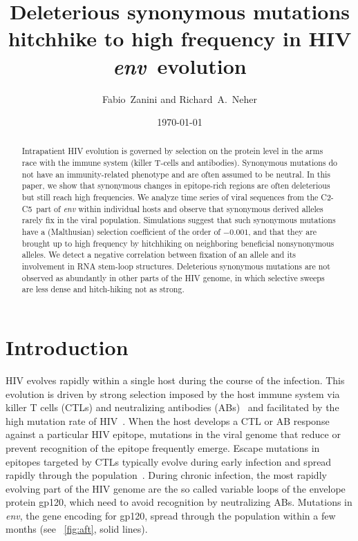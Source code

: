 \documentclass[rmp, twocolumn]{revtex4}
\newcommand{\env}{\textit{env}}
\newcommand{\shankaregion}{C2-C5}
\newcommand{\Author}{Fabio~Zanini and Richard~A.~Neher}
\newcommand{\Title}{Deleterious synonymous mutations hitchhike to high frequency in HIV \env~evolution}
\begin{document}
\title{\Title}
\author{\Author}
\date{\today}

\begin{abstract}
\noindent
Intrapatient HIV evolution is governed by selection on the protein level in the
arms race with the immune system (killer T-cells and antibodies). Synonymous
mutations do not have an immunity-related phenotype and are often assumed to be
neutral. In this paper, we show that synonymous changes in epitope-rich regions
are often deleterious but still reach high frequencies.  We analyze time
series of viral sequences from the \shankaregion~part of {\it env} within individual
hosts and observe that synonymous derived alleles rarely fix in the
viral population. Simulations suggest that such synonymous mutations
have a (Malthusian) selection coefficient of the order of $-0.001$, and that
they are brought up to high frequency by hitchhiking on neighboring beneficial
nonsynonymous alleles. We detect a negative correlation between fixation of an allele and
its involvement in RNA stem-loop structures.
Deleterious synonymous mutations are not observed as abundantly in other parts of the HIV genome, in which
selective sweeps are less dense and hitch-hiking not as strong.

\end{abstract}
\maketitle

\section{Introduction}

HIV evolves rapidly within a single host during the course of the infection.
This evolution is driven by strong selection imposed by the host immune system
via killer T cells (CTLs) and neutralizing antibodies
(ABs)~\citep{rambaut_causes_2004} and facilitated by the high
mutation rate of HIV~\citep{mansky_lower_1995}. When the host develops a CTL or
AB response against a particular HIV epitope, mutations in the viral genome that
reduce or prevent recognition of the epitope frequently emerge. Escape mutations
in epitopes targeted by CTLs typically evolve during early infection and spread
rapidly through the population~\citep{mcmichael_immune_2009}. During chronic
infection, the most rapidly evolving part of the HIV genome are the so called
variable loops of the envelope protein gp120, which need to avoid recognition by
neutralizing ABs.  Mutations in \env, the gene encoding for gp120, spread
through the population within a few months (see \figurename~\ref{fig:aft}, solid
lines).  
\end{document}
